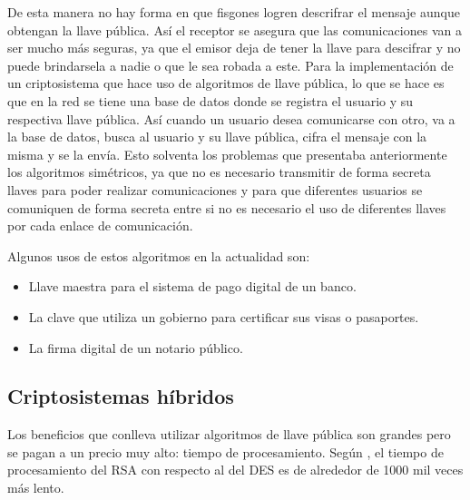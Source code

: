 De esta manera no hay forma en que fisgones logren descrifrar el mensaje aunque obtengan la llave pública. Así el receptor se asegura que las comunicaciones van a ser mucho más seguras, ya que el emisor deja de tener la llave para descifrar y no puede brindarsela a nadie o que le sea robada a este. Para la implementación de un criptosistema que hace uso de algoritmos de llave pública, lo que se hace es que en la red se tiene una base de datos donde se registra el usuario y su respectiva llave pública. Así cuando un usuario desea comunicarse con otro, va a la base de datos, busca al usuario y su llave pública, cifra el mensaje con la misma y se la envía. Esto solventa los problemas que presentaba anteriormente los algoritmos simétricos, ya que no es necesario transmitir de forma secreta llaves para poder realizar comunicaciones y para que diferentes usuarios se comuniquen de forma secreta entre si no es necesario el uso de diferentes llaves por cada enlace de comunicación. 

Algunos usos de estos algoritmos en la actualidad son:
\begin{itemize}
\item Llave maestra para el sistema de pago digital de un banco.
\item La clave que utiliza un gobierno para certificar sus visas o pasaportes.
\item La firma digital de un notario público.
\end{itemize} 

\subsection{Criptosistemas híbridos}
Los beneficios que conlleva utilizar algoritmos de llave pública son grandes pero se pagan a un precio muy alto: tiempo de procesamiento. Según \cite{bruce}, el tiempo de procesamiento del RSA con respecto al del DES es de alrededor de 1000 mil veces más lento. 


